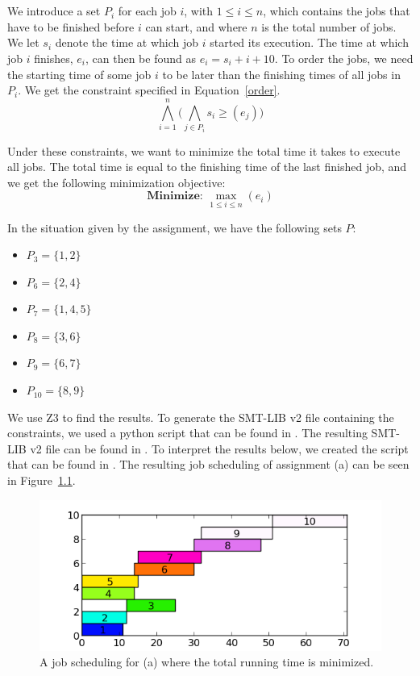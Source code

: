 \chapter{}\label{chp:3}
We introduce a set $P_i$ for each job $i$, with $1 \leq i \leq n$, which contains the jobs that have to be finished before $i$ can start, and where $n$ is the total number of jobs. We let $s_i$ denote the time at which job $i$ started its execution. The time at which job $i$ finishes, $e_i$, can then be found as $e_i = s_i + i + 10$. To order the jobs, we need the starting time of some job $i$ to be later than the finishing times of all jobs in $P_i$. We get the constraint specified in Equation~\ref{order}.
\begin{equation}
    \label{order}
    \bigwedge^{n}_{i=1}\big(\bigwedge_{j\in P_i} s_i \geq (e_j)\big)
\end{equation}

Under these constraints, we want to minimize the total time it takes to execute all jobs. The total time is equal to the finishing time of the last finished job, and we get the following minimization objective:
\begin{equation}
    \textbf{Minimize: }\max_{1\leq i \leq n}(e_i)
\end{equation}

In the situation given by the assignment, we have the following sets $P$:
\begin{itemize}
    \item $P_3 = \{1,2\}$
    \item $P_6 = \{2,4\}$
    \item $P_7 = \{1,4,5\}$
    \item $P_8 = \{3,6\}$
    \item $P_9 = \{6,7\}$
    \item $P_{10} = \{8,9\}$
\end{itemize}
We use Z3 to find the results. To generate the SMT-LIB v2 file containing the constraints, we used a python script that can be found in . The resulting SMT-LIB v2 file can be found in . To interpret the results below, we created the script that can be found in . The resulting job scheduling of assignment (a) can be seen in Figure~\ref{fig:3a}.
\begin{figure}[H]
    \centering
    \hspace*{-1cm}
    \includegraphics[width=\columnwidth]{3/a.pdf}
    \caption{A job scheduling for (a) where the total running time is minimized.}
    \label{fig:3a}
\end{figure}


